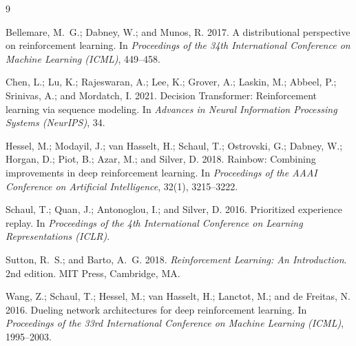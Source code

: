 \documentclass[letterpaper]{article}
\begin{document}
\begin{thebibliography}{9}

Bellemare, M.~G.; Dabney, W.; and Munos, R.
2017.
A distributional perspective on reinforcement learning.
In \textit{Proceedings of the 34th International Conference on Machine Learning (ICML)}, 449--458.

Chen, L.; Lu, K.; Rajeswaran, A.; Lee, K.; Grover, A.; Laskin, M.; Abbeel, P.; Srinivas, A.; and Mordatch, I.
2021.
Decision Transformer: Reinforcement learning via sequence modeling.
In \textit{Advances in Neural Information Processing Systems (NeurIPS)}, 34.

Hessel, M.; Modayil, J.; van Hasselt, H.; Schaul, T.; Ostrovski, G.; Dabney, W.; Horgan, D.; Piot, B.; Azar, M.; and Silver, D.
2018.
Rainbow: Combining improvements in deep reinforcement learning.
In \textit{Proceedings of the AAAI Conference on Artificial Intelligence}, 32(1), 3215--3222.

Schaul, T.; Quan, J.; Antonoglou, I.; and Silver, D.
2016.
Prioritized experience replay.
In \textit{Proceedings of the 4th International Conference on Learning Representations (ICLR)}.

Sutton, R.~S.; and Barto, A.~G.
2018.
\textit{Reinforcement Learning: An Introduction}.
2nd edition.
MIT Press, Cambridge, MA.

Wang, Z.; Schaul, T.; Hessel, M.; van Hasselt, H.; Lanctot, M.; and de Freitas, N.
2016.
Dueling network architectures for deep reinforcement learning.
In \textit{Proceedings of the 33rd International Conference on Machine Learning (ICML)}, 1995--2003.

\end{thebibliography}
\end{document}
